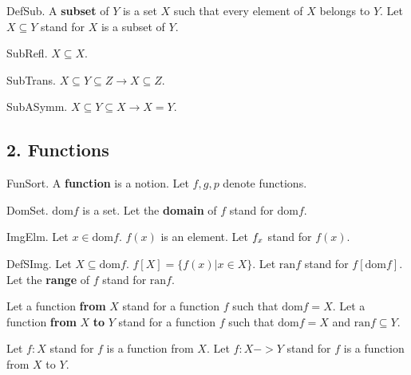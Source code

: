 \begin{definition} DefSub.  
A {\bf subset} of $Y$ is a set $X$ such that
every element of $X$ belongs to $Y$.
Let $X \subseteq Y$ stand for $X$ is a subset of $Y$.
\end{definition}

\begin{lemma} SubRefl.
$X \subseteq X$.
\end{lemma}

\begin{lemma} SubTrans.
$X \subseteq Y \subseteq Z  \rightarrow  X \subseteq Z$.
\end{lemma}

\begin{axiom} SubASymm.
$X \subseteq Y \subseteq X  \rightarrow  X = Y$.
\end{axiom}


\subsection{2. Functions}


\begin{signature} FunSort.
A {\bf function} is a notion.
Let $f,g,p$ denote functions.
\end{signature}

\begin{signature} DomSet.
$\text{dom} f$ is a set.
Let the {\bf domain} of $f$ stand for $\text{dom} f$.
\end{signature}

\begin{signature} ImgElm.
Let $x \in \text{dom} f$. $f(x)$ is an element.
Let ${f}_{x}$ stand for $f(x)$.
\end{signature}

\begin{definition} DefSImg. 
Let $X \subseteq \text{dom} f$. $f[X] = \{ f(x) | x \in X \}$.
Let $\text{ran} f$ stand for $f[\text{dom} f]$.
Let the {\bf range} of $f$ stand for $\text{ran} f$.

Let a function {\bf from} $X$ stand for a function $f$
such that $\text{dom} f = X$.
Let a function {\bf from} $X$ {\bf to} $Y$ stand 
for a function $f$ such that $\text{dom} f = X$
and $\text{ran} f \subseteq Y$.

Let $f : X$ stand for $f$ is a function from $X$.
Let $f : X -> Y$ stand for $f$ is a function from $X$ to $Y$.
\end{definition}

